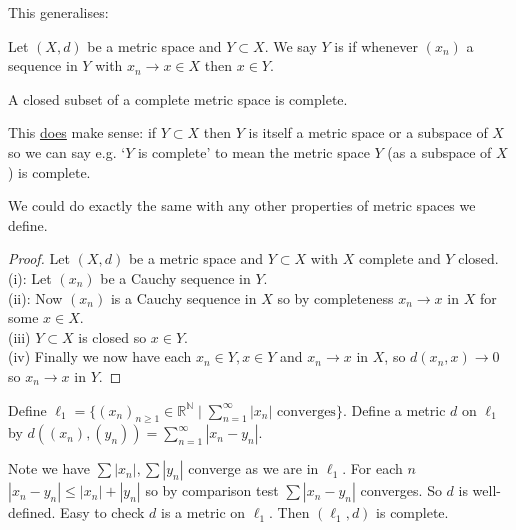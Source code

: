 This generalises:
\begin{definition}
    Let $(X, d)$ be a metric space and $Y \subset X$.
    We say $Y$ is  if whenever $(x_n)$ a sequence in $Y$ with $x_n \to x \in X$ then $x \in Y$.
\end{definition} 

\begin{proposition} \label{prp:18}
    A closed subset of a complete metric space is complete.
\end{proposition} 

\begin{remark}
    This \underline{does} make sense: if $Y \subset X$ then $Y$ is itself a metric space or a subspace of $X$ so we can say e.g. `$Y$ is complete' to mean the metric space $Y$ (as a subspace of $X$) is complete.

    We could do exactly the same with any other properties of metric spaces we define.
\end{remark} 

\begin{proof}
    Let $(X, d)$ be a metric space and $Y \subset X$ with $X$ complete and $Y$ closed.
    (i): Let $(x_n)$ be a Cauchy sequence in $Y$. \\
    (ii): Now $(x_n)$ is a Cauchy sequence in $X$ so by completeness $x_n \to x$ in $X$ for some $x \in X$. \\
    (iii) $Y \subset X$ is closed so $x \in Y$. \\
    (iv) Finally we now have each $x_n \in Y, x \in Y$ and $x_n \to x$ in $X$, so $d(x_n, x) \to 0$ so $x_n \to x$ in $Y$.
\end{proof} 

\begin{example}
    Define $\ell_1 = \{ (x_n)_{n \geq 1} \in \mathbb{R}^\mathbb{N} \mid \sum_{n=1}^{\infty} |x_n| \text{ converges} \}$.
    Define a metric $d$ on $\ell_1$ by $d((x_n), (y_n)) = \sum_{n=1}^{\infty} |x_n - y_n|$.

    Note we have $\sum |x_n|, \sum |y_n|$ converge as we are in $\ell_1$.
    For each $n$ $|x_n - y_n| \leq |x_n| + |y_n|$ so by comparison test $\sum |x_n - y_n|$ converges.
    So $d$ is well-defined.
    Easy to check $d$ is a metric on $\ell_1$.
    Then $(\ell_1, d)$ is complete.
\end{example} 

